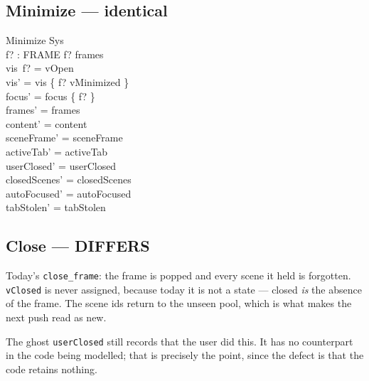 \documentclass[a4paper,10pt,fleqn]{article}
\begin{document}
\subsection{Minimize --- identical}

\begin{schema}{Minimize}
  \Delta Sys \\
  f? : FRAME
\where
  f? \in frames \\
  vis~f? = vOpen \\
  vis' = vis \oplus \{ f? \mapsto vMinimized \} \\
  focus' = focus \setminus \{ f? \} \\
  frames' = frames \\
  content' = content \\
  sceneFrame' = sceneFrame \\
  activeTab' = activeTab \\
  userClosed' = userClosed \\
  closedScenes' = closedScenes \\
  autoFocused' = autoFocused \\
  tabStolen' = tabStolen
\end{schema}

\subsection{Close --- DIFFERS}

Today's \texttt{close\_frame}: the frame is popped and every scene it held is
forgotten.  \texttt{vClosed} is never assigned, because today it is not a
state --- closed \emph{is} the absence of the frame.  The scene ids return to
the unseen pool, which is what makes the next push read as new.

The ghost \texttt{userClosed} still records that the user did this.  It has no
counterpart in the code being modelled; that is precisely the point, since the
defect is that the code retains nothing.
\end{document}
